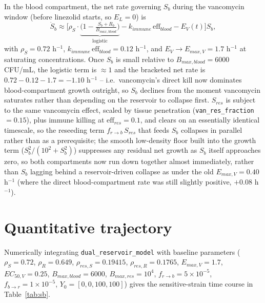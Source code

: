 \documentclass[11pt]{article}
\begin{document}
In the blood compartment, the net rate governing $S_b$ during the
vancomycin window (before linezolid starts, so $E_L = 0$) is
\begin{equation}
\dot S_b \approx \Big[\rho_S \cdot \underbrace{\big(1 - \tfrac{S_b+R_b}{B_{max,blood}}\big)}_{\text{logistic}} - k_{immune}\,\mathrm{eff}_{blood} - E_V(t)\Big] S_b ,
\end{equation}
with $\rho_S = 0.72$ h$^{-1}$, $k_{immune}\,\mathrm{eff}_{blood} = 0.12$
h$^{-1}$, and $E_V \to E_{max,V} = 1.7$ h$^{-1}$ at saturating
concentrations. Once $S_b$ is small relative to $B_{max,blood} = 6000$
CFU/mL, the logistic term is $\approx 1$ and the bracketed net rate is
$0.72 - 0.12 - 1.7 = -1.10$ h$^{-1}$ -- i.e.\ vancomycin's direct kill now
dominates blood-compartment growth outright, so $S_b$ declines from the
moment vancomycin saturates rather than depending on the reservoir to
collapse first. $S_{res}$ is subject to the same vancomycin effect, scaled
by tissue penetration (\texttt{van\_res\_fraction} $= 0.15$), plus immune
killing at $\mathrm{eff}_{res} = 0.1$, and clears on an essentially
identical timescale, so the reseeding term $f_{r\to b}\,S_{res}$ that feeds
$S_b$ collapses in parallel rather than as a prerequisite; the smooth
low-density floor built into the growth term ($S_b^2/(10^2+S_b^2)$)
suppresses any residual net growth as $S_b$ itself approaches zero, so both
compartments now run down together almost immediately, rather than $S_b$
lagging behind a reservoir-driven collapse as under the old $E_{max,V} =
0.40$ h$^{-1}$ (where the direct blood-compartment rate was still slightly
positive, $+0.08$ h$^{-1}$).

\section{Quantitative trajectory}

Numerically integrating \texttt{dual\_reservoir\_model} with baseline
parameters ($\rho_S = 0.72$, $\rho_R = 0.649$, $\rho_{res,S} = 0.19415$,
$\rho_{res,R} = 0.1765$, $E_{max,V} = 1.7$, $EC_{50,V} = 0.25$,
$B_{max,blood} = 6000$, $B_{max,res} = 10^4$, $f_{r\to b} = 5\times10^{-5}$,
$f_{b\to r} = 1\times10^{-5}$, $Y_0 = [0,0,100,100]$) gives the sensitive-strain
time course in Table~\ref{tab:sb}.
\end{document}
